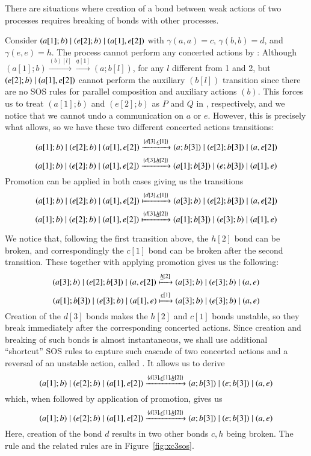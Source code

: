 {There are situations where creation of a bond between weak actions of two processes requires breaking of bonds with other processes. %

\begin{example}\label{ex:concert3}
{\rm Consider $(a[1];b)\; \vert \; (e[2];b)\; \vert \; (a[1],e[2])$ with $\gamma(a,a)=c$, $\gamma(b,b)=d$, and
$\gamma(e,e)=h$.
The process cannot perform any concerted actions by : Although $(a[1];b)  \xrightarrow{(b)[l]} 
\xrightarrow{\underline{a}[1]} (a;b[l])$, for any $l$ different from 1 and 2, but
$(e[2];b)\; \vert \; (a[1],e[2])$  cannot perform the auxiliary $(b[l])$
transition since there are no SOS rules for parallel composition and auxiliary actions $(b)$. This forces us
to treat $(a[1];b)$ and $ (e[2];b)$ as $P$ and $Q$ in , respectively, and we notice that
we cannot undo a communication on $a$ or $e$. However, this is precisely what  allows, so we have these two different concerted actions transitions:
$$
(a[1];b)\; \vert \; (e[2];b)\; \vert \; (a[1],e[2])  \xrightarrow{\{d[3], \underline{c}[1]\}} 
(a;b[3])\; \vert \; (e[2];b[3])\; \vert \; (a,e[2])
$$ 
$$
(a[1];b)\; \vert \; (e[2];b)\; \vert \; (a[1],e[2])  \xrightarrow{\{d[3], \underline{h}[2]\}} 
(a[1];b[3])\; \vert \; (e;b[3])\; \vert \; (a[1],e)
$$ 
Promotion can be applied in both cases giving us the transitions
$$
(a[1];b)\; \vert \; (e[2];b)\; \vert \; (a[1],e[2])  \xmapsto{\{d[3], \underline{c}[1]\}} 
(a[3];b)\; \vert \; (e[2];b[3])\; \vert \; (a,e[2])
$$ 
$$
(a[1];b)\; \vert \; (e[2];b)\; \vert \; (a[1],e[2])  \xmapsto{\{d[3], \underline{h}[2]\}} 
(a[1];b[3])\; \vert \; (e[3];b)\; \vert \; (a[1],e)
$$ 


We notice that, following the first transition above, the $h[2]$ bond can be broken, and correspondingly the $c[1]$ bond can be broken after the second transition. These together with applying promotion gives us the following:
$$
(a[3];b)\; \vert \; (e[2];b[3])\; \vert \; (a,e[2]) \xmapsto{\underline{h}[2]}  (a[3];b)\; \vert \; (e[3];b)\; \vert \; (a,e)
$$ 
$$
(a[1];b[3])\; \vert \; (e[3];b)\; \vert \; (a[1],e)  \xmapsto{\underline{c}[1]} (a[3];b)\; \vert \; (e[3];b)\; \vert \; (a,e) 
$$ 
Creation of the $d[3]$ bonds makes the $h[2]$ and $c[1]$ bonds unstable, so they break immediately
after the corresponding concerted actions. Since creation and breaking of such bonds is almost instantaneous, we shall use additional
``shortcut'' SOS rules to capture such cascade of two concerted actions and a reversal of an unstable action, called . It allows us to derive
$$
(a[1];b)\; \vert \; (e[2];b)\; \vert \; (a[1],e[2])  \xrightarrow{\{d[3], \underline{c}[1], \underline{h}[2]\}} 
(a;b[3])\; \vert \; (e;b[3])\; \vert \; (a,e) 
$$ 
which, when followed by application of promotion, gives us
$$
(a[1];b)\; \vert \; (e[2];b)\; \vert \; (a[1],e[2])  \xrightarrow{\{d[3], \underline{c}[1], \underline{h}[2]\}} 
(a;b[3])\; \vert \; (e;b[3])\; \vert \; (a,e) 
$$ 
Here, creation of the bond $d$ results in two other bonds $c, h$ being broken. The rule  and the related rules
are in Figure~\ref{fig:xc3sos}.}
\end{example}

}

